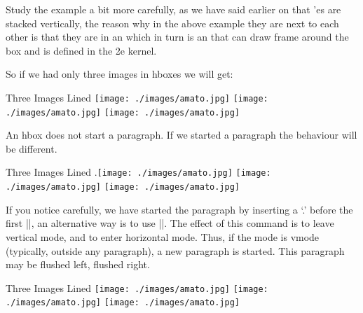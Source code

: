 \begin{texexample}{}{}
\end{texexample}

Study the example a bit more carefully, as we have said earlier on that 'es are stacked vertically, the reason why in the above example they are next to each other is that they are in an
 which in turn is an   that can draw  frame around the box and is defined in the
\latex2e kernel.

So if we had only three images in hboxes we will get:

\begin{texexample}{Three Images Lined}{}
\hbox{\texttt{[image: ./images/amato.jpg]}}%
\hbox{\texttt{[image: ./images/amato.jpg]}}%
\hbox{\texttt{[image: ./images/amato.jpg]}}%
\end{texexample}

An hbox does not start a paragraph. If we started a paragraph the behaviour will be different.

\begin{texexample}{Three Images Lined}{}
.\hbox{\texttt{[image: ./images/amato.jpg]}}%
\hbox{\texttt{[image: ./images/amato.jpg]}}%
\hbox{\texttt{[image: ./images/amato.jpg]}}%
\end{texexample}

If you notice carefully, we have started the paragraph by inserting a `.' before the first |\hbox|, an alternative way is to 
use |\leavevmode|. The effect of this command is to leave vertical mode, and to enter horizontal mode. Thus, if the mode is vmode (typically, outside any paragraph), a new paragraph is started. This paragraph may be flushed left, flushed right. 

\begin{texexample}{Three Images Lined}{}
\leavevmode
\hbox{\texttt{[image: ./images/amato.jpg]}}%
\hbox{\texttt{[image: ./images/amato.jpg]}}%
\hbox{\texttt{[image: ./images/amato.jpg]}}%

\meaning\leavevmode
\end{texexample}

